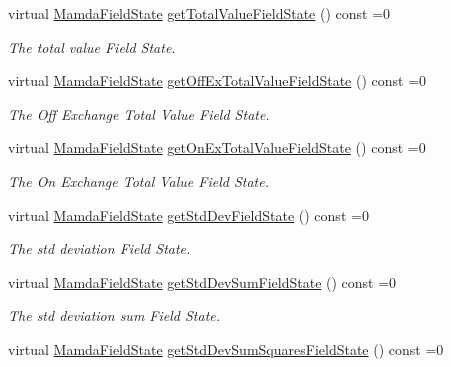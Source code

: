 \begin{CompactItemize}
virtual \hyperlink{namespaceWombat_93aac974f2ab713554fd12a1fa3b7d2a}{Mamda\-Field\-State} \hyperlink{classWombat_1_1MamdaTradeRecap_26e3f460f499d5bfe7e2d47a77a881ce}{get\-Total\-Value\-Field\-State} () const =0
\begin{CompactList}\small\item\em The total value Field State. \item\end{CompactList}\item 
virtual \hyperlink{namespaceWombat_93aac974f2ab713554fd12a1fa3b7d2a}{Mamda\-Field\-State} \hyperlink{classWombat_1_1MamdaTradeRecap_6db0ccb47fa8aac3e063a1833d9e0208}{get\-Off\-Ex\-Total\-Value\-Field\-State} () const =0
\begin{CompactList}\small\item\em The Off Exchange Total Value Field State. \item\end{CompactList}\item 
virtual \hyperlink{namespaceWombat_93aac974f2ab713554fd12a1fa3b7d2a}{Mamda\-Field\-State} \hyperlink{classWombat_1_1MamdaTradeRecap_bd3a92c7aa26621a03cd80ef45f37f12}{get\-On\-Ex\-Total\-Value\-Field\-State} () const =0
\begin{CompactList}\small\item\em The On Exchange Total Value Field State. \item\end{CompactList}\item 
virtual \hyperlink{namespaceWombat_93aac974f2ab713554fd12a1fa3b7d2a}{Mamda\-Field\-State} \hyperlink{classWombat_1_1MamdaTradeRecap_0555b4b9265d2aecd14660dacd6e8bf3}{get\-Std\-Dev\-Field\-State} () const =0
\begin{CompactList}\small\item\em The std deviation Field State. \item\end{CompactList}\item 
virtual \hyperlink{namespaceWombat_93aac974f2ab713554fd12a1fa3b7d2a}{Mamda\-Field\-State} \hyperlink{classWombat_1_1MamdaTradeRecap_301b9d3bf67f823437080caa7dbd0804}{get\-Std\-Dev\-Sum\-Field\-State} () const =0
\begin{CompactList}\small\item\em The std deviation sum Field State. \item\end{CompactList}\item 
virtual \hyperlink{namespaceWombat_93aac974f2ab713554fd12a1fa3b7d2a}{Mamda\-Field\-State} \hyperlink{classWombat_1_1MamdaTradeRecap_45483e8e818629de79c926ed89feaa9d}{get\-Std\-Dev\-Sum\-Squares\-Field\-State} () const =0

\end{CompactItemize}
